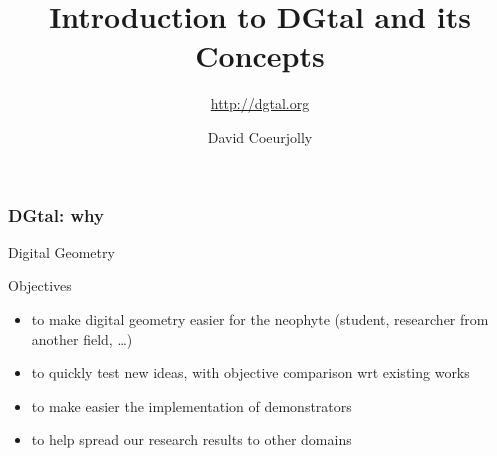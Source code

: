 \documentclass[8pt]{beamer}
\title[IPOL 2012 Meeting on Image Processing Libraries]{Introduction to  DGtal and its Concepts}
\subtitle{\url{http://dgtal.org}}
\author[D. Coeurjolly]{David Coeurjolly}
\begin{document}
\small






\begin{frame}[plain]
  \titlepage
\end{frame}

\begin{frame}%
  \frametitle{DGtal: why}
    \begin{alertblock}{} 
    \centering \large \alert{Digital Geometry}
  \end{alertblock}
  
\begin{block}{Objectives}
    \small
    \begin{itemize}
    \item to make digital geometry easier for the neophyte (student,
      researcher from another field, \ldots)
    \item to quickly test  new ideas, with objective comparison wrt
      existing works
    \item to make easier the implementation of demonstrators
    \item to help spread our research results to other domains
    \end{itemize}
  \end{block}
  
\end{frame}
\end{document}
